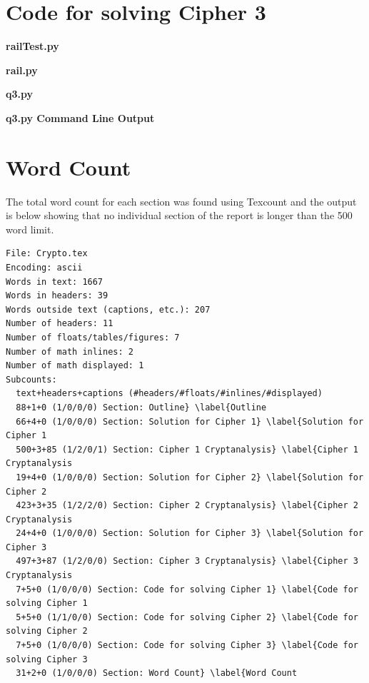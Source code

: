 \documentclass[a4paper,11pt]{article}
\begin{document}
\begin{appendices}
	\newpage
	\section{Code for solving Cipher 3} \label{Code for solving Cipher 3}		
		{\bfseries{railTest.py}}
		
		\newpage
		
		{\bfseries{rail.py}}
		
		\newpage

		{\bfseries{q3.py}}
		
		\newpage
		
		{\bfseries{q3.py Command Line Output}}
		
	
	\newpage
	\section{Word Count} \label{Word Count}
		The total word count for each section was found using Texcount and the output is below showing that no individual section of the report is longer than the 500 word limit.
		
		\begin{lstlisting}
File: Crypto.tex
Encoding: ascii
Words in text: 1667
Words in headers: 39
Words outside text (captions, etc.): 207
Number of headers: 11
Number of floats/tables/figures: 7
Number of math inlines: 2
Number of math displayed: 1
Subcounts:
  text+headers+captions (#headers/#floats/#inlines/#displayed)
  88+1+0 (1/0/0/0) Section: Outline} \label{Outline
  66+4+0 (1/0/0/0) Section: Solution for Cipher 1} \label{Solution for Cipher 1
  500+3+85 (1/2/0/1) Section: Cipher 1 Cryptanalysis} \label{Cipher 1 Cryptanalysis
  19+4+0 (1/0/0/0) Section: Solution for Cipher 2} \label{Solution for Cipher 2
  423+3+35 (1/2/2/0) Section: Cipher 2 Cryptanalysis} \label{Cipher 2 Cryptanalysis
  24+4+0 (1/0/0/0) Section: Solution for Cipher 3} \label{Solution for Cipher 3
  497+3+87 (1/2/0/0) Section: Cipher 3 Cryptanalysis} \label{Cipher 3 Cryptanalysis
  7+5+0 (1/0/0/0) Section: Code for solving Cipher 1} \label{Code for solving Cipher 1
  5+5+0 (1/1/0/0) Section: Code for solving Cipher 2} \label{Code for solving Cipher 2
  7+5+0 (1/0/0/0) Section: Code for solving Cipher 3} \label{Code for solving Cipher 3
  31+2+0 (1/0/0/0) Section: Word Count} \label{Word Count
		\end{lstlisting}
	
\end{appendices}
\end{document}
